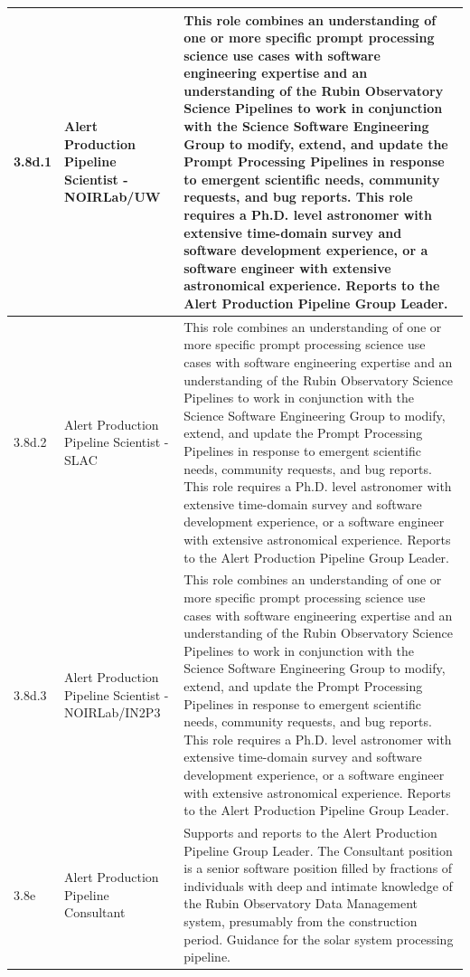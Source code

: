 \begin{longtable} {|p{}|p{}|p{}|}
{3.8d.1}&{Alert Production Pipeline Scientist - NOIRLab/UW}&{This role combines an understanding of one or more specific prompt processing science use cases with software engineering expertise and an understanding of the Rubin Observatory Science Pipelines to work in conjunction with the Science Software Engineering Group to modify, extend, and update the Prompt Processing Pipelines in response to emergent scientific needs, community requests, and bug reports. This role requires a Ph.D. level astronomer with extensive time-domain survey and software development experience, or a software engineer with extensive astronomical experience. Reports to the Alert Production Pipeline Group Leader.} \\ \hline
{3.8d.2}&{Alert Production Pipeline Scientist - SLAC}&{This role combines an understanding of one or more specific prompt processing science use cases with software engineering expertise and an understanding of the Rubin Observatory Science Pipelines to work in conjunction with the Science Software Engineering Group to modify, extend, and update the Prompt Processing Pipelines in response to emergent scientific needs, community requests, and bug reports. This role requires a Ph.D. level astronomer with extensive time-domain survey and software development experience, or a software engineer with extensive astronomical experience. Reports to the Alert Production Pipeline Group Leader.} \\ \hline
{3.8d.3}&{Alert Production Pipeline Scientist - NOIRLab/IN2P3}&{This role combines an understanding of one or more specific prompt processing science use cases with software engineering expertise and an understanding of the Rubin Observatory Science Pipelines to work in conjunction with the Science Software Engineering Group to modify, extend, and update the Prompt Processing Pipelines in response to emergent scientific needs, community requests, and bug reports. This role requires a Ph.D. level astronomer with extensive time-domain survey and software development experience, or a software engineer with extensive astronomical experience. Reports to the Alert Production Pipeline Group Leader.} \\ \hline
{3.8e}&{Alert Production Pipeline Consultant}&{Supports and reports to the Alert Production Pipeline Group Leader. The Consultant position is a senior software position filled by fractions of individuals with deep and intimate knowledge of the Rubin Observatory Data Management system, presumably from the construction period.  Guidance for the solar system processing pipeline. } \\ \hline

\end{longtable}
